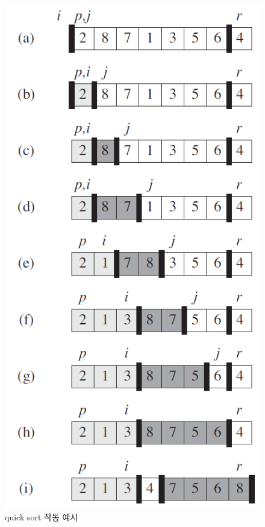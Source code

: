 \begin{figure}[h!]
    \centering
    \includegraphics[scale=0.7]{./QuickSort/pic/q1.png}
    \caption{quick sort 작동 예시\cite{reference1}}
\end{figure}


%
\newpage
